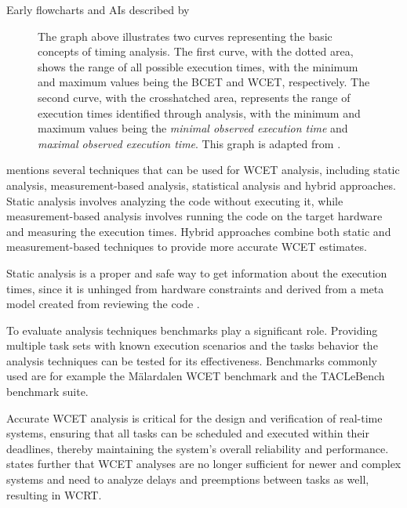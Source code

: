Early flowcharts and \ac{AI}s described by \textcite{cousotAbstractInterpretationUnified1977}


\begin{figure}[htbp]
	\centering
	\resizebox{\textwidth}{!}{
		
	}
	\caption{
		The graph above illustrates two curves representing the basic concepts of timing analysis.
		The first curve, with the dotted area, shows the range of all possible execution times, with the minimum and maximum values being the \ac{BCET} and \ac{WCET}, respectively.
		The second curve, with the crosshatched area, represents the range of execution times identified through analysis, with the minimum and maximum values being the \textit{minimal observed execution time} and \textit{maximal observed execution time}.
		This graph is adapted from \textcite{wilhelmWorstcaseExecutiontimeProblem2008}.
	}
	\label{fig:overestimation}
\end{figure}

\textcite{kelterWCETAnalysisOptimization} mentions several techniques that can be used for \ac{WCET} analysis, including static analysis, measurement-based analysis, statistical analysis and hybrid approaches.
Static analysis involves analyzing the code without executing it, while measurement-based analysis involves running the code on the target hardware and measuring the execution times.
Hybrid approaches combine both static and measurement-based techniques to provide more accurate \ac{WCET} estimates.

Static analysis is a proper and safe way to get information about the execution times, since it is unhinged from hardware constraints and derived from a meta model created from reviewing the code \cite{kelterWCETAnalysisOptimization}.

To evaluate analysis techniques benchmarks play a significant role.
Providing multiple task sets with known execution scenarios and the tasks behavior the analysis techniques can be tested for its effectiveness. 
Benchmarks commonly used are for example the Mälardalen \ac{WCET} benchmark and the TACLeBench benchmark suite\cite{falkTACLeBenchBenchmarkCollection2016}.

Accurate \ac{WCET} analysis is critical for the design and verification of real-time systems, ensuring that all tasks can be scheduled and executed within their deadlines, thereby maintaining the system's overall reliability and performance\cite{kelterWCETAnalysisOptimization}.
\textcite{kelterWCETAnalysisOptimization} states further that \ac{WCET} analyses are no longer sufficient for newer and complex systems and need to analyze delays and preemptions between tasks as well, resulting in \ac{WCRT}.

